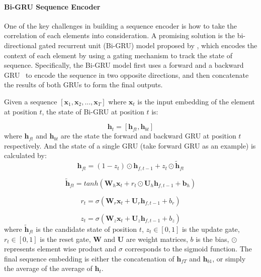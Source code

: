 \paragraph{Bi-GRU Sequence Encoder} 
One of the key challenges in building a sequence encoder is how to take the correlation of each elements into consideration. A promising solution is the bi-directional gated recurrent unit (Bi-GRU) model proposed by \cite{bahdanau2015neural}, which encodes the context of each element by using a gating mechanism to track the state of sequence.
Specifically, the Bi-GRU model first uses a forward and a backward GRU~\cite{cho2014learning} to encode the sequence in two opposite directions, and then concatenate the results of both GRUs to form the final outputs. 

Given a sequence $[\mathbf{x}_1, \mathbf{x}_2, ..., \mathbf{x}_T]$ where $\mathbf{x}_t$ is the input embedding of the element at position $t$, the state of Bi-GRU at position $t$ is:

\begin{equation}
\mathbf{h}_t = [\mathbf{h}_{ft}, \mathbf{h}_{bt}]
\end{equation}
where $\mathbf{h}_{ft}$ and $\mathbf{h}_{bt}$ are the state the forward and backward GRU at position $t$ respectively. And the state of a single GRU (take forward GRU as an example) is calculated by:
\begin{equation}
\mathbf{h}_{ft}=(1-z_t)\odot \mathbf{h}_{f,t-1} + z_t\odot \tilde{\mathbf{h}}_{ft}
\end{equation}

\begin{equation}
\tilde{\mathbf{h}}_{ft}=tanh(\mathbf{W}_h \mathbf{x}_t + r_t\odot \mathbf{U}_h \mathbf{h}_{f,t-1} + \mathbf{b}_h)
\end{equation}

\begin{equation}
r_t=\sigma(\mathbf{W}_r \mathbf{x}_t + \mathbf{U}_r \mathbf{h}_{f,t-1} + b_r)
\end{equation}

\begin{equation}
z_t=\sigma(\mathbf{W}_z \mathbf{x}_t+\mathbf{U}_z \mathbf{h}_{f,t-1} + b_z)
\end{equation}
where $\tilde{\mathbf{h}}_{ft}$ is the candidate state of position $t$, $z_t\in{[0,1]}$ is the update gate, $r_t\in{[0,1]}$ is the reset gate, $\mathbf{W}$ and $\mathbf{U}$ are weight matrices, $b$ is the bias, $\odot$ represents element wise product and $\sigma$ corresponds to the sigmoid function. The final sequence embedding is either the concatenation of $\mathbf{h}_{fT}$ and $\mathbf{h}_{b1}$, or simply the average of the average of $\mathbf{h}_t$.


